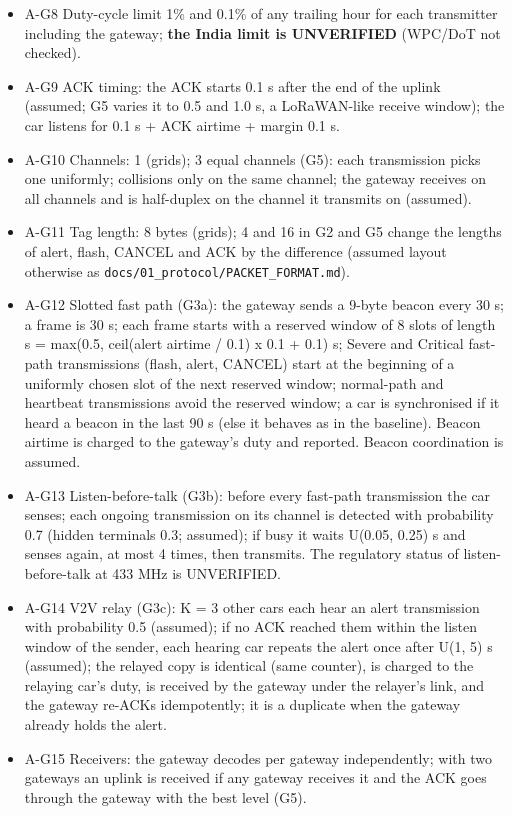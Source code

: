 \begin{itemize}
\item A-G8 Duty-cycle limit 1\% and 0.1\% of any trailing hour for each transmitter including the gateway; \textbf{the India limit is UNVERIFIED} (WPC/DoT not checked).
\item A-G9 ACK timing: the ACK starts 0.1 s after the end of the uplink (assumed; G5 varies it to 0.5 and 1.0 s, a LoRaWAN-like receive window); the car listens for 0.1 s + ACK airtime + margin 0.1 s.
\item A-G10 Channels: 1 (grids); 3 equal channels (G5): each transmission picks one uniformly; collisions only on the same channel; the gateway receives on all channels and is half-duplex on the channel it transmits on (assumed).
\item A-G11 Tag length: 8 bytes (grids); 4 and 16 in G2 and G5 change the lengths of alert, flash, CANCEL and ACK by the difference (assumed layout otherwise as \texttt{docs/01\_protocol/PACKET\_FORMAT.md}).
\item A-G12 Slotted fast path (G3a): the gateway sends a 9-byte beacon every 30 s; a frame is 30 s; each frame starts with a reserved window of 8 slots of length s = max(0.5, ceil(alert airtime / 0.1) x 0.1 + 0.1) s; Severe and Critical fast-path transmissions (flash, alert, CANCEL) start at the beginning of a uniformly chosen slot of the next reserved window; normal-path and heartbeat transmissions avoid the reserved window; a car is synchronised if it heard a beacon in the last 90 s (else it behaves as in the baseline). Beacon airtime is charged to the gateway's duty and reported. Beacon coordination is assumed.
\item A-G13 Listen-before-talk (G3b): before every fast-path transmission the car senses; each ongoing transmission on its channel is detected with probability 0.7 (hidden terminals 0.3; assumed); if busy it waits U(0.05, 0.25) s and senses again, at most 4 times, then transmits. The regulatory status of listen-before-talk at 433 MHz is UNVERIFIED.
\item A-G14 V2V relay (G3c): K = 3 other cars each hear an alert transmission with probability 0.5 (assumed); if no ACK reached them within the listen window of the sender, each hearing car repeats the alert once after U(1, 5) s (assumed); the relayed copy is identical (same counter), is charged to the relaying car's duty, is received by the gateway under the relayer's link, and the gateway re-ACKs idempotently; it is a duplicate when the gateway already holds the alert.
\item A-G15 Receivers: the gateway decodes per gateway independently; with two gateways an uplink is received if any gateway receives it and the ACK goes through the gateway with the best level (G5).
\end{itemize}
